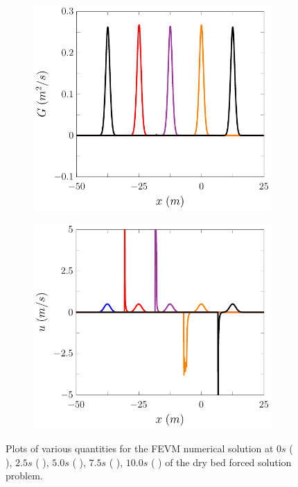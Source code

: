 \begin{figure}
\begin{subfigure}{0.5\textwidth}
		\vspace{0.5cm}
	\end{subfigure}
	\begin{subfigure}{0.5\textwidth}
		\includegraphics[width=\textwidth]{./chp5/figures/Forced/Dry/FEVMG.pdf}
		\vspace{0.5cm}
	\end{subfigure}%
	\begin{subfigure}{0.5\textwidth}
		\includegraphics[width=\textwidth]{./chp5/figures/Forced/Dry/FEVMu.pdf}
		\vspace{0.5cm}
	\end{subfigure}
	\caption{Plots of various quantities for the FEVM numerical solution at $0s$ ({\color{blue} \solidrule}), $2.5s$ ({\color{red} \solidrule}), $5.0s$ ({\color{violet!80!white} \solidrule}), $7.5s$ ({\color{orange} \solidrule}), $10.0s$ ({\color{black} \solidrule}) of the dry bed forced solution problem.}
	\label{fig:ForcedFEVMP2PExAll}
\end{figure}

